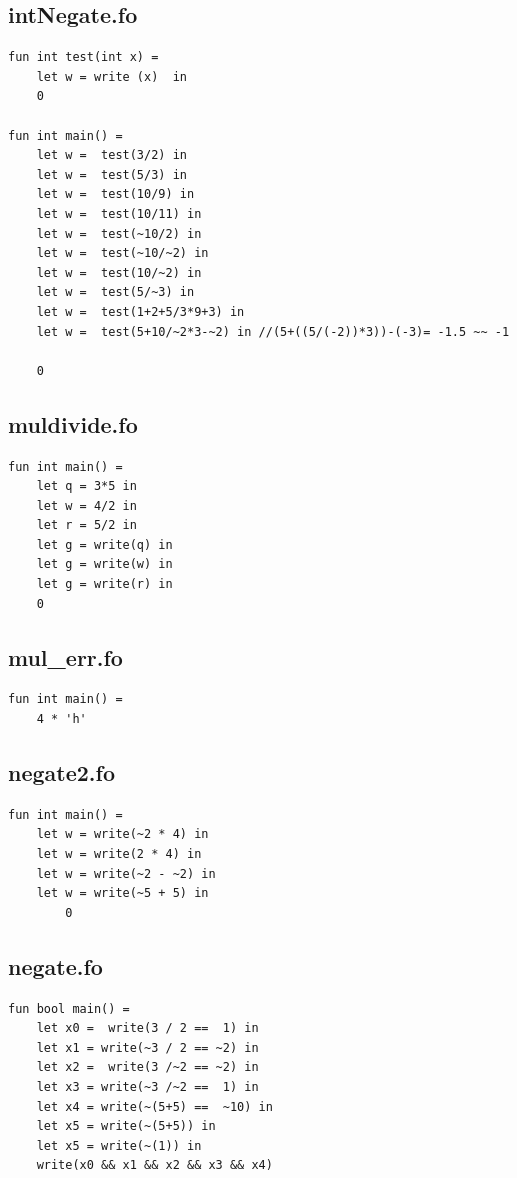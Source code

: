 \documentclass[11pt]{article}
\begin{document}
    \subsection{intNegate.fo}
    \begin{lstlisting}[basicstyle=\small]
fun int test(int x) =
    let w = write (x)  in
    0

fun int main() =
    let w =  test(3/2) in
    let w =  test(5/3) in
    let w =  test(10/9) in
    let w =  test(10/11) in
    let w =  test(~10/2) in
    let w =  test(~10/~2) in
    let w =  test(10/~2) in
    let w =  test(5/~3) in
    let w =  test(1+2+5/3*9+3) in
    let w =  test(5+10/~2*3-~2) in //(5+((5/(-2))*3))-(-3)= -1.5 ~~ -1

    0
    \end{lstlisting}

    \subsection{muldivide.fo}
    \begin{lstlisting}[basicstyle=\small]
fun int main() =
    let q = 3*5 in
    let w = 4/2 in
    let r = 5/2 in
    let g = write(q) in
    let g = write(w) in
    let g = write(r) in
    0
    \end{lstlisting}

    \subsection{mul\_err.fo}
    \begin{lstlisting}[basicstyle=\small]
fun int main() =
    4 * 'h'
    \end{lstlisting}

    \subsection{negate2.fo}
    \begin{lstlisting}[basicstyle=\small]
fun int main() =
    let w = write(~2 * 4) in
    let w = write(2 * 4) in
    let w = write(~2 - ~2) in
    let w = write(~5 + 5) in
        0
    \end{lstlisting}

    \subsection{negate.fo}
    \begin{lstlisting}[basicstyle=\small]
fun bool main() =
    let x0 =  write(3 / 2 ==  1) in
    let x1 = write(~3 / 2 == ~2) in
    let x2 =  write(3 /~2 == ~2) in
    let x3 = write(~3 /~2 ==  1) in
    let x4 = write(~(5+5) ==  ~10) in
    let x5 = write(~(5+5)) in
    let x5 = write(~(1)) in
    write(x0 && x1 && x2 && x3 && x4)
    \end{lstlisting}
\end{document}

